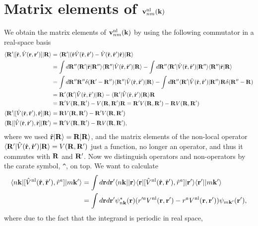 \section{Matrix elements of \texorpdfstring{$\bfv^\nl_{nm}(\bfk)$}{Vnonlocal}}\label{appvnl}
We obtain the matrix elements of $\bfv^\nl_{nm}(\bfk)$ by using
the following commutator in a
real-space basis
\begin{align}\label{cn0}
\bra{\bfR'}[\hat\bfr,\hat V(\bfr,\bfr')]\ket{\bfR}
&=
\bra{\bfR'}(\hat\bfr\hat V(\hat\bfr,\hat\bfr')
-
\hat V(\hat\bfr,\hat\bfr')\hat\bfr
)
\ket{\bfR}
\nonumber\\
&=
\int d\bfR''\bra{\bfR'}\hat\bfr\ket{\bfR''}\bra{\bfR''}\hat V(\hat\bfr,\hat\bfr') \ket{\bfR}
-
\int d\bfR''\bra{\bfR'}\hat V(\hat\bfr,\hat\bfr')\ket{\bfR''}\bra{\bfR''}\hat\bfr\ket{\bfR}
\nonumber\\
&=
\int d\bfR'' \bfR''\gd(\bfR'-\bfR'')
\bra{\bfR''}\hat V(\hat\bfr,\hat\bfr') \ket{\bfR}
-
\int d\bfR''\bra{\bfR'}\hat V(\hat\bfr,\hat\bfr')\ket{\bfR''}\bfR\gd(\bfR''-\bfR)
\nonumber\\
&=
\bfR'\bra{\bfR'}\hat V(\hat\bfr,\hat\bfr') \ket{\bfR}
-
\bra{\bfR'}\hat V(\hat\bfr,\hat\bfr')\ket{\bfR}\bfR
\nonumber\\
&=
\bfR'
V(\bfR,\bfR')
-
V(\bfR,\bfR')
\bfR
=
\bfR'
V(\bfR,\bfR')
-
\bfR
 V(\bfR,\bfR')
\nonumber\\
\bra{\bfR'}[\hat V(\hat\bfr,\hat\bfr'),\hat\bfr]\ket{\bfR}
&=
\bfR
V(\bfR,\bfR')
-
\bfR'
 V(\bfR,\bfR')
\nonumber\\
\bra{\bfR}[\hat V(\hat\bfr,\hat\bfr'),\hat\bfr]\ket{\bfR'}
&=
\bfR'
V(\bfR,\bfR')
-
\bfR
 V(\bfR,\bfR')
,
\end{align} 
where we used $\hat\bfr\ket{\bfR}=\bfR\ket{\bfR}$, and
the matrix elements of the non-local operator
$\bra{\bfR'}\hat V(\hat\bfr,\hat\bfr')\ket{\bfR}=V(\bfR,\bfR')$ just a
function, no longer an operator, and thus it commutes with $\bfR$ and $\bfR'$.
Now we distinguish operators and non-operators by the carate symbol,
\verb=^=, on top.
We want to calculate
\begin{align}\label{cn2}
\bra{n\bfk}[\hat V^\nl(\hat\bfr,\hat\bfr'),\hat r^a]\ket{m\bfk'}
&=
\int d\bfr d\bfr'
\bra{n\bfk}
\ket{\bfr}\bra{\bfr}
[\hat V^\nl(\hat\bfr,\hat\bfr'),\hat r^a]
\ket{\bfr'}\bra{\bfr'}
\ket{m\bfk'}
\nonumber\\
&=
\int d\bfr d\bfr'
\psi^*_{n\bfk}(\bfr)
(  
r'^a V^\nl(\bfr,\bfr')
-  
r^aV^\nl(\bfr,\bfr')
)
\psi_{m\bfk'}(\bfr')
,
\end{align}  
where due to the fact that the integrand is periodic in real space,
